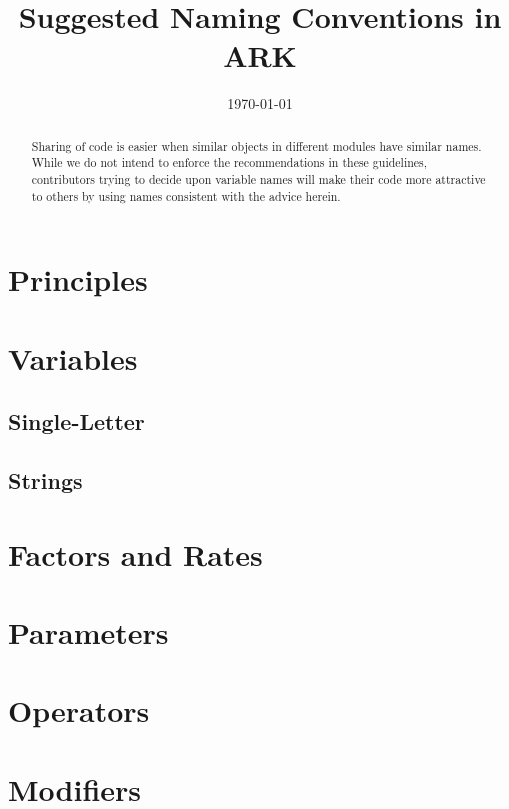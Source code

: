 \documentclass[12pt]{econtex}
\begin{document}
\title{Suggested Naming Conventions in ARK}

\date{\today}

\vspace{2in}



\maketitle 


\begin{abstract}
  Sharing of code is easier when similar objects in different modules
  have similar names.  While we do not intend to enforce the
  recommendations in these guidelines, contributors trying to decide
  upon variable names will make their code more attractive to others
  by using names consistent with the advice herein.
\end{abstract}



\pagebreak

\section{Principles}


\pagebreak

\section{Variables}

\subsection{Single-Letter}


\pagebreak

\subsection{Strings}


\section{Factors and Rates}



\section{Parameters}


\section{Operators}


\section{Modifiers}



\end{document}
